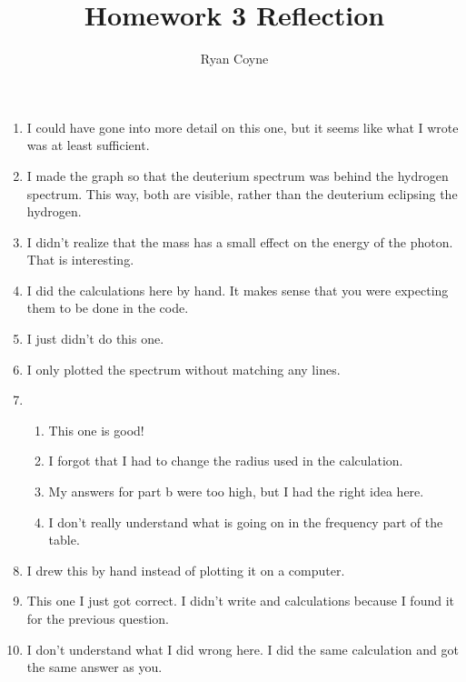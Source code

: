 \documentclass[12pt]{article}
\begin{document}
    \title{Homework 3 Reflection}
    \author{Ryan Coyne}
    \maketitle
    
    \begin{enumerate}
        \item I could have gone into more detail on this one, but it seems like what I wrote was at least sufficient.
        \item I made the graph so that the deuterium spectrum was behind the hydrogen spectrum. This way, both are visible, rather than the deuterium eclipsing the hydrogen.
        \item I didn't realize that the mass has a small effect on the energy of the photon. That is interesting.
        \item I did the calculations here by hand. It makes sense that you were expecting them to be done in the code.
        \item I just didn't do this one. 
        \item I only plotted the spectrum without matching any lines.
        \item \begin{enumerate}
            \item This one is good!
            \item I forgot that I had to change the radius used in the calculation.
            \item My answers for part b were too high, but I had the right idea here.
            \item I don't really understand what is going on in the frequency part of the table.
        \end{enumerate}
        \item I drew this by hand instead of plotting it on a computer. 
        \item This one I just got correct. I didn't write and calculations because I found it for the previous question.
        \item I don't understand what I did wrong here. I did the same calculation and got the same answer as you. 
    \end{enumerate}
\end{document}
